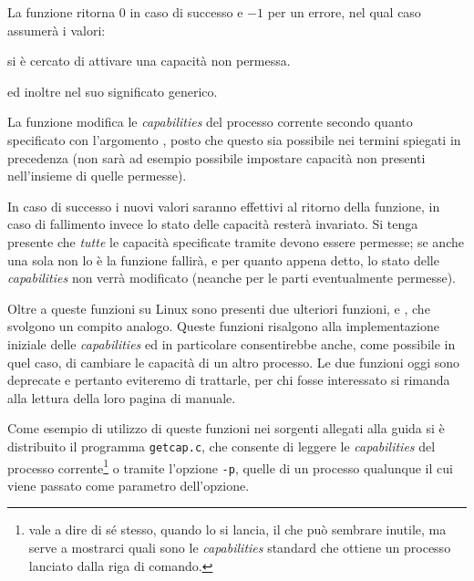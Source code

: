 \begin{funcproto}{
}

{La funzione ritorna $0$ in caso di successo e $-1$ per un errore, nel qual
  caso  assumerà i valori:
  \begin{errlist}
  \item[\errcode{EPERM}] si è cercato di attivare una capacità non permessa.
  \end{errlist} ed inoltre  nel suo significato generico.}
\end{funcproto}

La funzione modifica le \textit{capabilities} del processo corrente secondo
quanto specificato con l'argomento , posto che questo sia
possibile nei termini spiegati in precedenza (non sarà ad esempio possibile
impostare capacità non presenti nell'insieme di quelle permesse). 

In caso di successo i nuovi valori saranno effettivi al ritorno della
funzione, in caso di fallimento invece lo stato delle capacità resterà
invariato. Si tenga presente che \textsl{tutte} le capacità specificate
tramite  devono essere permesse; se anche una sola non lo è la
funzione fallirà, e per quanto appena detto, lo stato delle
\textit{capabilities} non verrà modificato (neanche per le parti eventualmente
permesse).

Oltre a queste funzioni su Linux sono presenti due ulteriori funzioni,
 e , che svolgono un compito analogo. Queste
funzioni risalgono alla implementazione iniziale delle \textit{capabilities}
ed in particolare  consentirebbe anche, come possibile in quel
caso, di cambiare le capacità di un altro processo. Le due funzioni oggi sono
deprecate e pertanto eviteremo di trattarle, per chi fosse interessato si
rimanda alla lettura della loro pagina di manuale.

Come esempio di utilizzo di queste funzioni nei sorgenti allegati alla guida
si è distribuito il programma \texttt{getcap.c}, che consente di leggere le
\textit{capabilities} del processo corrente\footnote{vale a dire di sé stesso,
  quando lo si lancia, il che può sembrare inutile, ma serve a mostrarci quali
  sono le \textit{capabilities} standard che ottiene un processo lanciato
  dalla riga di comando.} o tramite l'opzione \texttt{-p}, quelle di un
processo qualunque il cui  viene passato come parametro dell'opzione.

